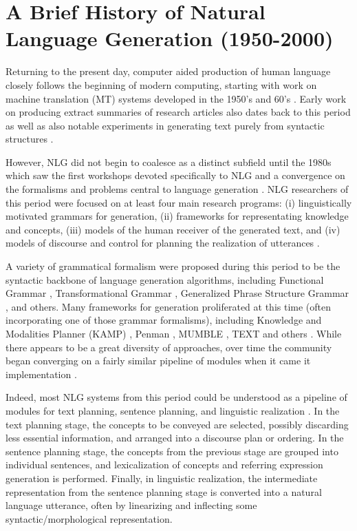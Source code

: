 \section{A Brief History of Natural Language Generation (1950-2000)}
  
Returning to the present day, computer aided production of human language
closely follows the beginning of modern computing, starting with work on
machine translation (MT) systems developed in the 1950's and 60's
\citep{ornstein1955mechanical,national1966language,hutchins2003machine}. Early
work on producing extract summaries of research articles also dates back to
this period \citep{luhn1958automatic} as well as  also notable experiments in
generating text purely from syntactic structures \citep{yngve1961random}.
  
However, NLG did not begin to coalesce as a distinct subfield until the 1980s
which saw the first workshops devoted specifically to NLG  and a convergence
on the formalisms and problems central to language generation
\citep{reiter1997building,mcdonald2010natural}.  NLG researchers of this
period were focused on at least four main research programs: (i)
linguistically motivated grammars for generation, (ii) frameworks for
representating knowledge and concepts, (iii) models of the human receiver of
the generated text, and (iv) models of discourse and control for planning the
realization of utterances \citep{mann1981text}. 
  
  
A variety of grammatical formalism were proposed during this period to be the
syntactic backbone of language generation algorithms, including Functional
Grammar \citep{halliday2013halliday}, Transformational Grammar
\citep{chomsky1965aspects}, Generalized Phrase Structure Grammar
\citep{gazdar1985generalized}, and others. Many frameworks for generation
proliferated at this time (often incorporating one of those grammar
formalisms), including Knowledge and Modalities Planner (KAMP)
\citep{appelt1982planning}, Penman \citep{hovy1993natural}, MUMBLE
\citep{McDonald1981MUMBLEAF}, TEXT \citep{mckeown1982text} and others
\citep{mann1981text}.  While there appears to be a great diversity of
approaches, over time the community began converging on a fairly similar
pipeline of modules when it came it implementation \citep{reiter1994has}. 
  
Indeed, most NLG systems from this period could be understood as a pipeline of
modules for text planning, sentence planning, and linguistic realization
\citep{reiter1997building}.  In the text planning stage, the concepts to be
conveyed are selected, possibly discarding less essential information, and
arranged into a discourse plan or ordering. In the sentence planning stage,
the concepts from the previous stage are grouped into individual sentences,
and lexicalization of concepts and referring expression generation is
performed.  Finally, in linguistic realization, the intermediate
representation from the sentence planning stage is converted into a natural
language utterance, often by linearizing and inflecting some
syntactic/morphological representation.
  
